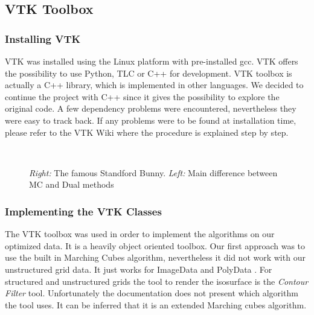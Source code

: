 \subsection{VTK Toolbox}
\subsubsection{Installing VTK}
VTK was installed using the Linux platform with pre-installed gcc. VTK offers the possibility to use Python, TLC or C++ for
development. VTK toolbox is actually a C++ library, which is implemented in other languages. We
decided to continue the project with C++ since it gives the possibility to explore the original code.
A few dependency problems were encountered, nevertheless they were easy to track back. If any
problems were to be found at installation time, please refer to the VTK Wiki where the procedure
is explained step by step.

\begin{figure}
\centering
   \\
   \caption{\textit{Right:} The famous Standford Bunny. \textit{Left:} Main difference between MC and Dual methods }
\end{figure}

\subsubsection{Implementing the VTK Classes}
The VTK toolbox was used in order to implement the algorithms on our optimized data. It is a heavily object
oriented toolbox. Our first approach was to use the built in Marching Cubes algorithm,
nevertheless it did not work with our unstructured grid data. It just works for ImageData and
PolyData . For structured and unstructured grids the tool to render the isosurface is the \textit{Contour Filter} tool. Unfortunately the documentation does not present which algorithm the tool uses. It
can be inferred that it is an extended Marching cubes algorithm.

